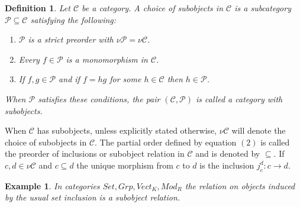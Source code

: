 \documentclass{amsart}
\theoremstyle{plain}
\newtheorem{exam}{Example}
\newtheorem{defn}{Definition}
\begin{document}
\begin{defn} 
	Let $ \mathcal{C} $ be a category. A choice of subobjects in $ \mathcal{C} $ is a subcategory $ \mathcal{P} \subseteq \mathcal{C} $ satisfying the following:
	\begin{enumerate}
		\item[(a)] $\mathcal{P}$ is a strict preorder with $\nu \mathcal{P} = \nu \mathcal{C}$.
		\item[(b)] Every $f \in \mathcal{P} $ is a monomorphism in  $\mathcal{C}$.
		\item[(c)] If $f, g \in \mathcal{P}$ and if $f = hg$ for some $h \in \mathcal{C}$ then $h \in \mathcal{P}$.
	\end{enumerate}
	When $\mathcal{P}$ satisfies these conditions, the pair $ (\mathcal{C},\mathcal{P})$ is called a category with subobjects.
\end{defn}
When $\mathcal{C} $ has  subobjects, unless explicitly stated otherwise, $ \nu\mathcal{C} $ will denote the choice of subobjects in $ \mathcal{C} $. The partial order defined by equation $(2)$ is called the preorder of inclusions or subobject relation in $ \mathcal{C} $ and is denoted by $ \subseteq $. If $c,d \in \nu\mathcal{C}$ and $ c\subseteq d $ the unique morphism from $c$ to $d$ is the inclusion $j_c^d: c \rightarrow d $. 

\begin{exam}
	In categories $Set, Grp, Vect_K, Mod_R $ the relation on objects induced  by the usual set inclusion is a subobject relation.
\end{exam}
	
	
\end{document}
